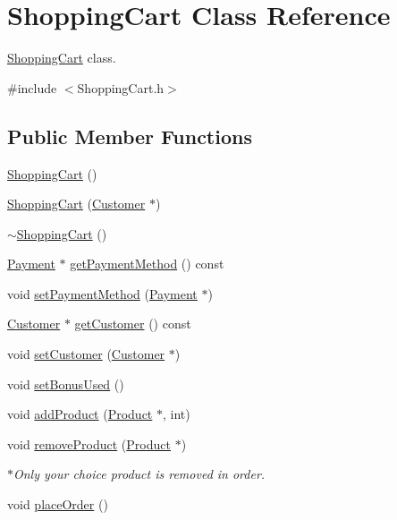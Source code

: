 \hypertarget{classShoppingCart}{}\section{Shopping\+Cart Class Reference}
\label{classShoppingCart}


\hyperlink{classShoppingCart}{Shopping\+Cart} class.  




{\ttfamily \#include $<$Shopping\+Cart.\+h$>$}

\subsection*{Public Member Functions}
\begin{DoxyCompactItemize}
\item 
\hyperlink{classShoppingCart_aa499286a2d3e4fcea8ee97a15f6d54c0}{Shopping\+Cart} ()
\item 
\hyperlink{classShoppingCart_af7a004471b1321cd7ee3b725be7bc7d7}{Shopping\+Cart} (\hyperlink{classCustomer}{Customer} $\ast$)
\item 
\hyperlink{classShoppingCart_a9a042afb412e560720b74920f5fac50a}{$\sim$\+Shopping\+Cart} ()
\item 
\hyperlink{classPayment}{Payment} $\ast$ \hyperlink{classShoppingCart_ada58cd717f897b9f3c1a2e042674a26b}{get\+Payment\+Method} () const 
\item 
void \hyperlink{classShoppingCart_a1648a74b6b51553740a964d39732f62a}{set\+Payment\+Method} (\hyperlink{classPayment}{Payment} $\ast$)
\item 
\hyperlink{classCustomer}{Customer} $\ast$ \hyperlink{classShoppingCart_a765e303006757a4e01ad2c6729afca9a}{get\+Customer} () const 
\item 
void \hyperlink{classShoppingCart_afa31abf8f6244304419f4e6caf3b109c}{set\+Customer} (\hyperlink{classCustomer}{Customer} $\ast$)
\item 
void \hyperlink{classShoppingCart_a2ed167d69492c61daf08754b4e3f99cf}{set\+Bonus\+Used} ()
\item 
void \hyperlink{classShoppingCart_afcab6367adfc0be9e37dd037a43b4ce2}{add\+Product} (\hyperlink{classProduct}{Product} $\ast$, int)
\item 
void \hyperlink{classShoppingCart_ad82371a6788905b99e6a03e3cd359242}{remove\+Product} (\hyperlink{classProduct}{Product} $\ast$)
\begin{DoxyCompactList}\small\item\em $\ast$\+Only your choice product is removed in order. \end{DoxyCompactList}\item 
void \hyperlink{classShoppingCart_af02e91c37822093ea7d8a2d63e8601a4}{place\+Order} ()\hypertarget{classShoppingCart_af02e91c37822093ea7d8a2d63e8601a4}{}\label{classShoppingCart_af02e91c37822093ea7d8a2d63e8601a4}


\end{DoxyCompactItemize}
